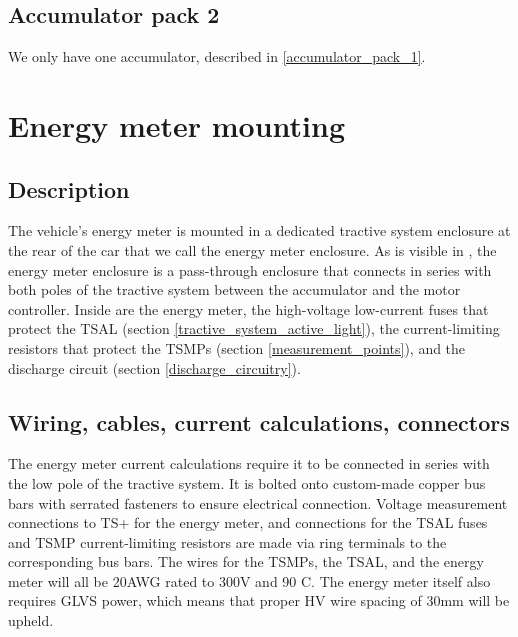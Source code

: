 \documentclass{article}
\begin{document}
\subsection{Accumulator pack 2}\label{accumulator_pack_2}
We only have one accumulator, described in \ref{accumulator_pack_1}.

\section{Energy meter mounting} \label{sec:energy_meter_mounting}
\subsection{Description}
The vehicle's energy meter is mounted in a dedicated tractive system enclosure at the rear of the car that we call the energy meter enclosure. As is visible in , the energy meter enclosure is a pass-through enclosure that connects in series with both poles of the tractive system between the accumulator and the motor controller. Inside are the energy meter, the high-voltage low-current fuses that protect the TSAL (section \ref{tractive_system_active_light}), the current-limiting resistors that protect the TSMPs (section \ref{measurement_points}), and the discharge circuit (section \ref{discharge_circuitry}). 

\subsection{Wiring, cables, current calculations, connectors}

The energy meter current calculations require it to be connected in series with the low pole of the tractive system. It is bolted onto custom-made copper bus bars with serrated fasteners to ensure electrical connection. Voltage measurement connections to TS+ for the energy meter, and connections for the TSAL fuses and TSMP current-limiting resistors are made via ring terminals to the corresponding bus bars. The wires for the TSMPs, the TSAL, and the energy meter will all be 20AWG rated to 300V and 90 \textdegree C. The energy meter itself also requires GLVS power, which means that proper HV wire spacing of 30mm will be upheld. 
\end{document}
